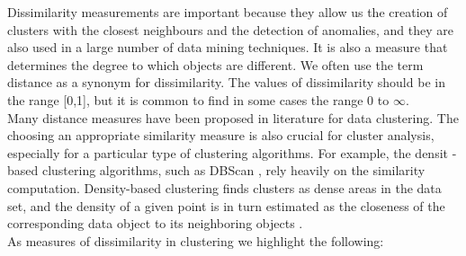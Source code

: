 Dissimilarity measurements are important because they allow us the creation of clusters with the closest neighbours and the detection of anomalies, and they are also used in a large number of data mining techniques. It is also a measure that determines the degree to which objects are different. We often use the term distance as a synonym for dissimilarity. The values of dissimilarity should be in the range [0,1], but it is common to find in some cases the range 0 to $\infty$.
\\
Many distance measures have been proposed in literature for data clustering. The choosing an appropriate similarity measure is also crucial for cluster analysis, especially for a particular type of clustering algorithms. For example, the densit -based clustering algorithms, such as DBScan \cite{b28}, rely heavily on the similarity computation. Density-based clustering finds clusters as dense areas in the data set, and the density of a given point is in turn estimated as the closeness of the corresponding data object to its neighboring objects \cite{b50} \cite{b51}.
\\
As measures of dissimilarity in clustering we highlight the following:

